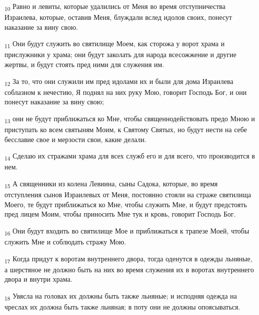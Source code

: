 \begin{tcolorbox}
\textsubscript{10} Равно и левиты, которые удалились от Меня во время отступничества Израилева, которые, оставив Меня, блуждали вслед идолов своих, понесут наказание за вину свою.
\end{tcolorbox}
\begin{tcolorbox}
\textsubscript{11} Они будут служить во святилище Моем, как сторожа у ворот храма и прислужники у храма; они будут заколать для народа всесожжение и другие жертвы, и будут стоять пред ними для служения им.
\end{tcolorbox}
\begin{tcolorbox}
\textsubscript{12} За то, что они служили им пред идолами их и были для дома Израилева соблазном к нечестию, Я поднял на них руку Мою, говорит Господь Бог, и они понесут наказание за вину свою;
\end{tcolorbox}
\begin{tcolorbox}
\textsubscript{13} они не будут приближаться ко Мне, чтобы священнодействовать предо Мною и приступать ко всем святыням Моим, к Святому Святых, но будут нести на себе бесславие свое и мерзости свои, какие делали.
\end{tcolorbox}
\begin{tcolorbox}
\textsubscript{14} Сделаю их стражами храма для всех служб его и для всего, что производится в нем.
\end{tcolorbox}
\begin{tcolorbox}
\textsubscript{15} А священники из колена Левиина, сыны Садока, которые, во время отступления сынов Израилевых от Меня, постоянно стояли на страже святилища Моего, те будут приближаться ко Мне, чтобы служить Мне, и будут предстоять пред лицем Моим, чтобы приносить Мне тук и кровь, говорит Господь Бог.
\end{tcolorbox}
\begin{tcolorbox}
\textsubscript{16} Они будут входить во святилище Мое и приближаться к трапезе Моей, чтобы служить Мне и соблюдать стражу Мою.
\end{tcolorbox}
\begin{tcolorbox}
\textsubscript{17} Когда придут к воротам внутреннего двора, тогда оденутся в одежды льняные, а шерстяное не должно быть на них во время служения их в воротах внутреннего двора и внутри храма.
\end{tcolorbox}
\begin{tcolorbox}
\textsubscript{18} Увясла на головах их должны быть также льняные; и исподняя одежда на чреслах их должна быть также льняная; в поту они не должны опоясываться.
\end{tcolorbox}
